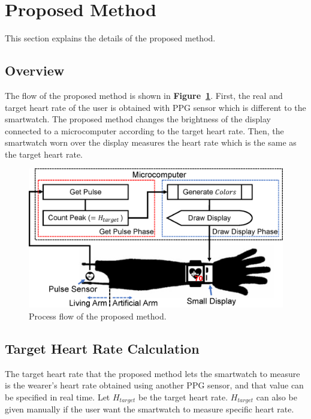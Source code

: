 \documentclass[sigchi,authordraft]{acmart}
\newcommand\figref[1]{\textbf{Figure~\ref{fig:#1}}}
\begin{document}
\section{Proposed Method}
\label{sec:method}
This section explains the details of the proposed method.

\subsection{Overview}
\label{subsec:overview}
The flow of the proposed method is shown in \figref{method}. First, the real and target heart rate of the user is obtained with PPG sensor which is different to the smartwatch. The proposed method changes the brightness of the display connected to a microcomputer according to the target heart rate. Then, the smartwatch worn over the display measures the heart rate which is the same as the target heart rate.\par

\begin{figure}[!t]
  \centering
  \includegraphics[width=1\linewidth]{figures/method.eps}
  \caption{Process flow of the proposed method.}
  \label{fig:method}
\end{figure}

\subsection{Target Heart Rate Calculation}
The target heart rate that the proposed method lets the smartwatch to measure is the wearer's heart rate obtained using another PPG sensor, and that value can be specified in real time. Let $H_{target}$ be the target heart rate. $H_{target}$ can also be given manually if the user want the smartwatch to measure specific heart rate.
\end{document}
